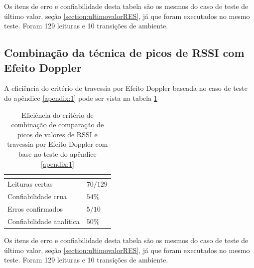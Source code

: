 Os itens de erro e confiabilidade desta tabela são os mesmos do caso de teste de último valor, seção \ref{section:ultimovalorRES}, já que foram executados no mesmo teste. Foram 129 leituras e 10 transições de ambiente.

\subsection{Combinação da técnica de picos de RSSI com Efeito Doppler}

A eficiência do critério de travessia por Efeito Doppler baseada no caso de teste do apêndice \ref{apendix:1} pode ser vista na tabela \ref{tab:resultados6}

\begin{table}[H]
\centering
\caption{Eficiência do critério de combinação de comparação de picos de valores de RSSI e travessia por Efeito Doppler com base no teste do apêndice \ref{apendix:1} }
\label{tab:resultados6}
\begin{tabular}{p{5cm} p{5cm}}
\hline
\multicolumn{2}{c}{\cellcolor{lightgray}{Eficiência do critério: Travessia por efeito Doppler}} \\ \hline
Leituras certas         &   $70 / 129$        \\
Confiabilidade crua    &   $54\%$     \\
Erros confirmados          &  $5 / 10$        \\
Confiabilidade analítica & $50\%$ \\ \hline
\end{tabular}
\end{table}

Os itens de erro e confiabilidade desta tabela são os mesmos do caso de teste de último valor, seção \ref{section:ultimovalorRES}, já que foram executados no mesmo teste. Foram 129 leituras e 10 transições de ambiente.